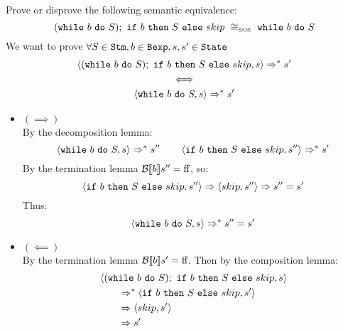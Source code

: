 \begin{exercise}{
    Prove or disprove the following semantic equivalence:
    \[ (\wwhile{b}{S});\ \wif{b}{S}{skip}\ \SOScong\ \wwhile{b}{S} \]
}
    We want to prove $\forall S \in \texttt{Stm}, b \in \texttt{Bexp}, s, s' \in \texttt{State}$
    \begin{gather*}
        \left<(\texttt{while}\ b\ \texttt{do}\ S);\ \texttt{if}\ b\ \texttt{then}\ S\ \texttt{else}\ skip, s\right> \Rightarrow^* s' \\
        \iff \\
        \left<\texttt{while}\ b\ \texttt{do}\ S, s\right> \Rightarrow^* s'
    \end{gather*}
    \begin{itemize}
        \item $(\implies)$ \vspace{0.2cm} \\
            By the decomposition lemma: \vspace*{-0.3cm}
            \[ \left<\texttt{while}\ b\ \texttt{do}\ S, s\right> \Rightarrow^* s'' \qquad \left<\texttt{if}\ b\ \texttt{then}\ S\ \texttt{else}\ skip, s''\right> \Rightarrow^* s' \]
            By the termination lemma $\mathcal{B} \llbracket b \rrbracket s'' = \text{ff}$, so:\vspace*{-0.3cm}
            \[ \left<\texttt{if}\ b\ \texttt{then}\ S\ \texttt{else}\ skip, s''\right> \Rightarrow \left<skip, s''\right> \Rightarrow s'' = s' \]
            Thus:
            \[ \left<\texttt{while}\ b\ \texttt{do}\ S, s\right> \Rightarrow^* s'' = s' \]
        \item $(\impliedby)$ \vspace{0.2cm} \\
            By the termination lemma $\mathcal{B} \llbracket b \rrbracket s' = \text{ff}$. Then by the composition lemma: \vspace*{-0.3cm}
            \begin{align*}
                &\left<(\texttt{while}\ b\ \texttt{do}\ S);\ \texttt{if}\ b\ \texttt{then}\ S\ \texttt{else}\ skip, s\right>
                \\&\qquad \Rightarrow^* \left<\texttt{if}\ b\ \texttt{then}\ S\ \texttt{else}\ skip, s'\right>
                \\&\qquad \Rightarrow \left<skip, s'\right>
                \\&\qquad \Rightarrow s'
            \end{align*}
    \end{itemize}
\end{exercise}
